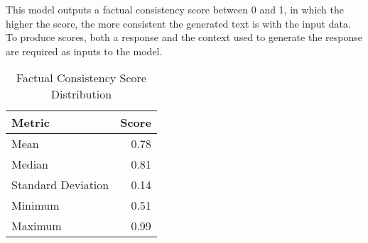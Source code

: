 This model outputs a factual consistency score between 0 and 1, in which the higher the score, the more consistent the generated text is with the input data.
To produce scores, both a response and the context used to generate the response are required as inputs to the model. 

\begin{table}[h]
\centering
\caption{Factual Consistency Score Distribution}
\begin{tabular}{lr}
\hline
Metric & Score \\
\hline
Mean & 0.78 \\
Median & 0.81 \\
Standard Deviation & 0.14 \\
Minimum & 0.51 \\
Maximum & 0.99 \\
\hline
\end{tabular}
\label{tab:factual-consistency-scores}
\end{table}